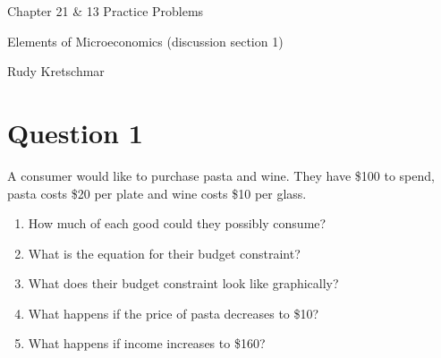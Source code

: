 \documentclass[12pt]{article}
\begin{document}
\begin{center}
\Large Chapter 21 \& 13 Practice Problems

\medskip

\normalsize Elements of Microeconomics (discussion section 1)

\medskip

\small Rudy Kretschmar
\end{center}

\section*{Question 1}
A consumer would like to purchase pasta and wine. They have \$100 to spend, pasta costs \$20 per plate and wine costs \$10 per glass.
\begin{enumerate}
    \item How much of each good could they possibly consume?
    \item What is the equation for their budget constraint?
    \item What does their budget constraint look like graphically?
    \item What happens if the price of pasta decreases to \$10?
    \item What happens if income increases to \$160?
\end{enumerate}
\end{document}
